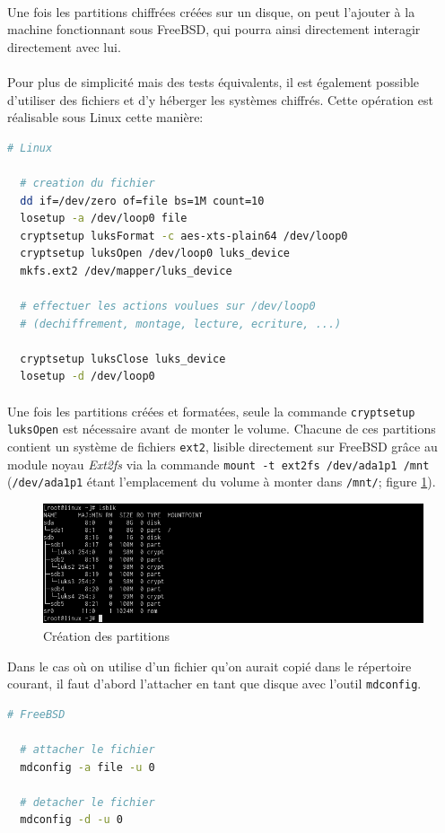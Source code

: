 \paragraph{}
Une fois les partitions chiffrées créées sur un disque, on peut l'ajouter à la
machine fonctionnant sous FreeBSD, qui pourra ainsi directement interagir
directement avec lui.
\paragraph{}
Pour plus de simplicité mais des tests équivalents, il est également possible
d'utiliser des fichiers et d'y héberger les systèmes chiffrés. Cette opération
est réalisable sous Linux cette manière:
\\
\begin{lstlisting}[language=bash]
  # Linux
  
  # creation du fichier
  dd if=/dev/zero of=file bs=1M count=10
  losetup -a /dev/loop0 file
  cryptsetup luksFormat -c aes-xts-plain64 /dev/loop0
  cryptsetup luksOpen /dev/loop0 luks_device
  mkfs.ext2 /dev/mapper/luks_device

  # effectuer les actions voulues sur /dev/loop0
  # (dechiffrement, montage, lecture, ecriture, ...)

  cryptsetup luksClose luks_device
  losetup -d /dev/loop0
\end{lstlisting}
\paragraph{}
Une fois les partitions créées et formatées, seule la commande
\texttt{cryptsetup luksOpen} est nécessaire avant de monter le volume. Chacune
de ces partitions contient un système de fichiers \texttt{ext2}, lisible
directement sur FreeBSD grâce au module noyau \textit{Ext2fs} via la commande
\texttt{mount -t ext2fs /dev/ada1p1 /mnt} (\texttt{/dev/ada1p1} étant
l'emplacement du volume à monter dans \texttt{/mnt/}; figure
\ref{fig:linux_partitions}).
\begin{figure}[H]
  \centering
  \includegraphics[width=\linewidth]{tests/linux_partitions.png}
  \caption{\label{fig:linux_partitions}Création des partitions}
\end{figure}
Dans le cas où on utilise d'un fichier qu'on aurait copié dans le répertoire
courant, il faut d'abord l'attacher en tant que disque avec l'outil
\texttt{mdconfig}.
\\
\begin{lstlisting}[language=bash]
  # FreeBSD
  
  # attacher le fichier
  mdconfig -a file -u 0

  # detacher le fichier
  mdconfig -d -u 0
\end{lstlisting}
